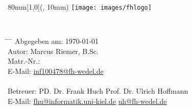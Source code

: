 \begin{titlepage}
  \vspace*{30ex}
  \begin{textblock*}{80mm}[1,0](\paperwidth, 10mm)
    \centering
    \texttt{[image: images/fhlogo]}
  \end{textblock*}
  \begin{center}
    \sffamily{}
    {\huge\bfseries\doctitle} \\[4ex]
    {\Large\docsubtitle}
  \end{center}
  \vspace*{40ex}
  \begin{tabbing}
    \hspace{8em} \= \hspace{14em} \= \hspace{8em} \= \kill
    Abgegeben am: \> \today{} \\[5ex]
    Autor: \> Marcus Riemer, B.Sc. \\
    Matr.-Nr.:  \\
    E-Mail: \> \href{mailto:inf100478@fh-wedel.de}{inf100478@fh-wedel.de} \\

    \\
    Betreuer: \> PD. Dr. Frank Huch  \> Prof. Dr. Ulrich Hoffmann \\
    E-Mail: \> \href{mailto:fhu@informatik.uni-kiel.de}{fhu@informatik.uni-kiel.de} \> \href{mailto:uh@fh-wedel.de}{uh@fh-wedel.de}
  \end{tabbing}
\end{titlepage}

